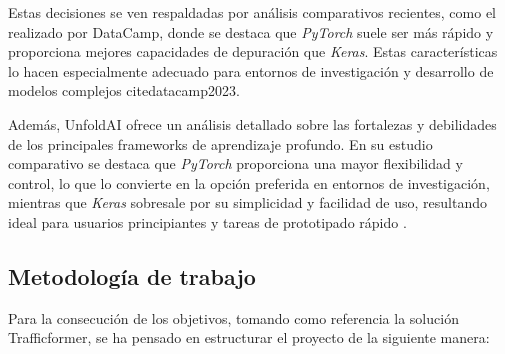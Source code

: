 Estas decisiones se ven respaldadas por análisis comparativos recientes, como el realizado por DataCamp, donde se destaca que \textit{PyTorch} suele ser más rápido y proporciona mejores capacidades de depuración que \textit{Keras}. Estas características lo hacen especialmente adecuado para entornos de investigación y desarrollo de modelos complejos cite{datacamp2023}.

Además, UnfoldAI ofrece un análisis detallado sobre las fortalezas y debilidades de los principales frameworks de aprendizaje profundo. En su estudio comparativo se destaca que \textit{PyTorch} proporciona una mayor flexibilidad y control, lo que lo convierte en la opción preferida en entornos de investigación, mientras que \textit{Keras} sobresale por su simplicidad y facilidad de uso, resultando ideal para usuarios principiantes y tareas de prototipado rápido \cite{unfoldai2024}.

\subsection{Metodología de trabajo}

Para la consecución de los objetivos, tomando como referencia la solución Trafficformer, se ha pensado en estructurar el proyecto de la siguiente manera:

